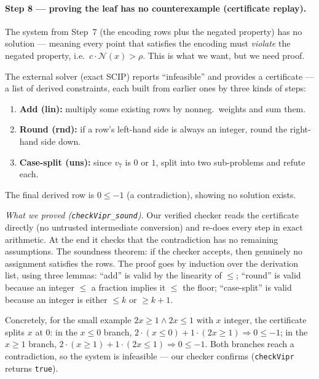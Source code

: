 \documentclass[runningheads]{llncs}
\newcommand{\net}{\mathcal{N}}
\newcommand{\scip}{\textsc{SCIP}}
\newcommand{\code}[1]{\texttt{#1}}
\begin{document}
\paragraph{Step 8 --- proving the leaf has no counterexample (certificate replay).}
The system from Step~7 (the encoding rows plus the negated property) has no solution
--- meaning every point that satisfies the encoding must \emph{violate} the negated
property, i.e.\ $c\cdot\net(x)>\rho$. This is what we want, but we need proof.

The external solver (exact \scip{}) reports ``infeasible'' and provides a certificate
--- a list of derived constraints, each built from earlier ones by three kinds of
steps:
\begin{enumerate}
\item \textbf{Add (lin):} multiply some existing rows by nonneg.\ weights and sum them.
\item \textbf{Round (rnd):} if a row's left-hand side is always an integer, round the
      right-hand side down.
\item \textbf{Case-split (uns):} since $v_7$ is $0$ or $1$, split into two sub-problems
      and refute each.
\end{enumerate}
The final derived row is $0\le-1$ (a contradiction), showing no solution exists.

\emph{What we proved (\code{checkVipr\_sound}).} Our verified checker reads the
certificate directly (no untrusted intermediate conversion) and re-does every step in
exact arithmetic. At the end it checks that the contradiction has no remaining
assumptions. The soundness theorem: if the checker accepts, then genuinely no
assignment satisfies the rows. The proof goes by induction over the derivation list,
using three lemmas: ``add'' is valid by the linearity of $\le$; ``round'' is valid
because an integer $\le$ a fraction implies it $\le$ the floor; ``case-split'' is valid
because an integer is either $\le k$ or $\ge k{+}1$.

Concretely, for the small example $2x\ge1\wedge2x\le1$ with $x$ integer, the
certificate splits $x$ at $0$: in the $x\le0$ branch, $2\!\cdot\!(x\le0)+1\!\cdot\!
(2x\ge1)\Rightarrow 0\le-1$; in the $x\ge1$ branch, $2\!\cdot\!(x\ge1)+1\!\cdot\!
(2x\le1)\Rightarrow 0\le-1$. Both branches reach a contradiction, so the system is
infeasible --- our checker confirms (\code{checkVipr} returns \code{true}).
\end{document}
